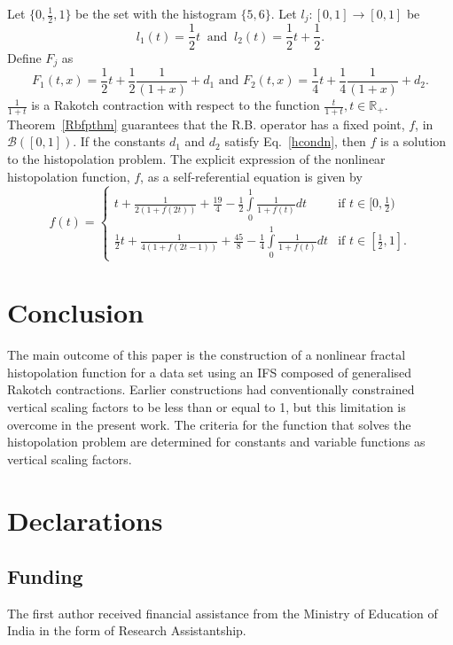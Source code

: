 \documentclass[sn-mathphys-num]{sn-jnl}
\numberwithin{equation}{section}
\begin{document}
\begin{example}
Let $\{0,\frac{1}{2},1\}$ be the set with the histogram $\{5,6\}$.
Let $l_j:[0,1]\rightarrow[0,1]$ be
\begin{equation*}
    l_1(t)=\frac{1}{2}t ~\text{ and }~
    l_2(t)=\frac{1}{2}t+\frac{1}{2}.
\end{equation*}
Define $F_j$ as
\begin{equation*}
     F_1(t,x)=\frac{1}{2}t+\frac{1}{2}\frac{1}{(1+x)}+d_1 \text{ and } 
    F_2(t,x)=\frac{1}{4}t+\frac{1}{4}\frac{1}{(1+x)}+d_2.
\end{equation*}
   $\frac{1}{1+t}$ is a Rakotch contraction with respect to the function $\frac{t}{1+t}, t\in\mathbb{R_+}$. Theorem~\ref {Rbfpthm} guarantees that the R.B. operator has a fixed point, $f$, in $\mathcal{B}([0,1])$. If the constants $d_1$ and $d_2$ satisfy Eq.~\eqref{hcondn}, then $f$ is a solution to the histopolation problem. 
The explicit expression of the nonlinear histopolation function, $f$, as a self-referential equation is given by
\begin{equation*}
f(t)= 
\begin{cases}
t+\frac{1}{2(1+f(2t))}+\frac{19}{4}-\frac{1}{2}\int\limits_{0}^1\frac{1}{1+f(t)}dt& \text{if } t\in[0,\frac{1}{2})\\
\frac{1}{2}t+\frac{1}{4(1+f(2t-1))}+\frac{45}{8}-\frac{1}{4}\int\limits_0^{1}\frac{1}{1+f(t)}dt& \text{if } t\in[\frac{1}{2},1].
\end{cases}
\end{equation*}
\end{example}
\section{Conclusion}
\noindent The main outcome of this paper is the construction of a nonlinear fractal histopolation function for a data set using an IFS composed of generalised Rakotch contractions. Earlier constructions had conventionally constrained vertical scaling factors to be less than or equal to 1, but this limitation is overcome in the present work. The criteria for the function that solves the histopolation problem are determined for constants and variable functions as vertical scaling factors.
\section{Declarations}
\subsection*{Funding}
\noindent The first author received financial assistance from the Ministry of Education of India in the form of Research Assistantship.
\end{document}
